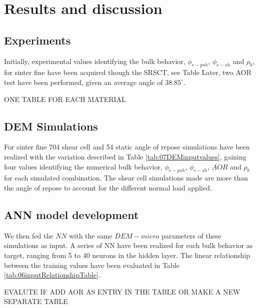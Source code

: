 \section{Results and discussion}
\label{sec:results}

\subsection{Experiments}
\label{subsec:experiments}

Initially, experimental values identifying the bulk behavior, $\phi_{e-psh}$, 
$\phi_{e-sh}$ and $\rho_{b}$, for sinter fine have been acquired though the
SRSCT, see Table 
Later, two AOR test have been performed, given an average angle of $38.85
^\circ$.
 
ONE TABLE FOR EACH MATERIAL

% 
% 

\subsection{DEM Simulations}
\label{subsec:simulations}
% 
For sinter fine 704 shear cell and 54 static angle of repose simulations have
been realized with the variation described in Table \ref{tab:07DEMinputvalues},
gaining four values identifying the numerical bulk behavior, $\phi_{e-psh}$, 
$\phi_{e-sh}$, $AOR$ and $\rho_{b}$ for each simulated combination.
The shear cell simulations made are more than the angle of repose to account for
the different normal load applied.




\subsection{ANN model development}
\label{subsec:annmodeldev}

We then fed the $NN$ with the same $DEM-micro$ parameters of these simulations
as input.
A series of NN have been realized for each bulk behavior as target, ranging from
5 to 40 neurons in the hidden layer.
The linear relationship between the
training values have been evaluated in Table \ref{tab:06inputRelationshipTable}.

EVALUTE IF ADD AOR AS ENTRY IN THE TABLE OR MAKE A NEW SEPARATE TABLE



% 

